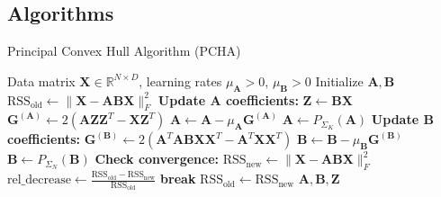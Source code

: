 \documentclass[oneside]{article}
\begin{document}
\subsection{Algorithms}

\begin{algorithm}
\caption{Principal Convex Hull Algorithm (PCHA)}
\label{alg:pcha_short}
\begin{algorithmic}[1]
\Require Data matrix $\mathbf{X} \in \mathbb{R}^{N \times D}$, learning rates $\mu_{\mathbf{A}} > 0$, $\mu_{\mathbf{B}} > 0$
\State Initialize $\mathbf{A}, \mathbf{B}$
\State $\text{RSS}_{\text{old}} \gets \| \mathbf{X} - \mathbf{A} \mathbf{B} \mathbf{X} \|_F^2$
    \Statex \hspace{-\algorithmicindent} \textbf{Update A coefficients:}
    \State $\mathbf{Z} \gets \mathbf{B} \mathbf{X}$ 
    \State $\mathbf{G}^{(\mathbf{A})} \gets 2(\mathbf{A} \mathbf{Z} \mathbf{Z}^T - \mathbf{X} \mathbf{Z}^T)$ 
    \State $\mathbf{A} \gets \mathbf{A} - \mu_{\mathbf{A}} \mathbf{G}^{(\mathbf{A})}$ 
    \State $\mathbf{A} \gets P_{\Sigma_K}(\mathbf{A})$ 
    \Statex \hspace{-\algorithmicindent} \textbf{Update B coefficients:}
    \State $\mathbf{G}^{(\mathbf{B})} \gets 2(\mathbf{A}^T \mathbf{A} \mathbf{B} \mathbf{X} \mathbf{X}^T - \mathbf{A}^T \mathbf{X} \mathbf{X}^T)$ 
    \State $\mathbf{B} \gets \mathbf{B} - \mu_{\mathbf{B}} \mathbf{G}^{(\mathbf{B})}$ 
    \State $\mathbf{B} \gets P_{\Sigma_N}(\mathbf{B})$ 
    \Statex \hspace{-\algorithmicindent} \textbf{Check convergence:}
    \State $\text{RSS}_{\text{new}} \gets \| \mathbf{X} - \mathbf{A} \mathbf{B} \mathbf{X} \|_F^2$
    \State $\text{rel\_decrease} \gets \frac{\text{RSS}_{\text{old}} - \text{RSS}_{\text{new}}}{\text{RSS}_{\text{old}}}$ 
        \State \textbf{break} 
    \EndIf
    \State $\text{RSS}_{\text{old}} \gets \text{RSS}_{\text{new}}$
\EndWhile
\State \Return $\mathbf{A}, \mathbf{B}, \mathbf{Z}$
\end{algorithmic}
\end{algorithm}
\end{document}

